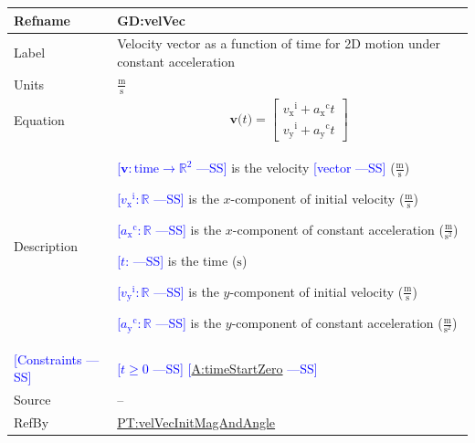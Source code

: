 \documentclass[12pt]{article}
\newcommand{\authornote}[3]{\textcolor{#1}{[#3 ---#2]}}
\newcommand{\authornote}[3]{}
\newcommand{\wss}[1]{\authornote{blue}{SS}{#1}}
\begin{document}
\noindent
\begin{minipage}{\textwidth}
\begin{tabular}{>{\raggedright}p{}>{\raggedright\arraybackslash}p{}}
\toprule \textbf{Refname} & \textbf{GD:velVec}
\label{GD:velVec}
\\ \midrule
Label & Velocity vector as a function of time for 2D motion under constant acceleration
        
\\ \midrule
Units & $\frac{\text{m}}{\text{s}}$
        
\\ \midrule
Equation & \begin{displaymath}
           \symbf{v}\text{(}t\text{)}=\begin{bmatrix}
                                      {{v_{\text{x}}}^{\text{i}}}+{{a_{\text{x}}}^{\text{c}}} t\\
                                      {{v_{\text{y}}}^{\text{i}}}+{{a_{\text{y}}}^{\text{c}}} t
                                      \end{bmatrix}
           \end{displaymath}
\\ \midrule
Description & \begin{symbDescription}
              \item{\wss{$\symbf{v}: \text{time} \rightarrow \mathbb{R}^2$} is the velocity \wss{vector} ($\frac{\text{m}}{\text{s}}$)}
              \item{\wss{${{v_{\text{x}}}^{\text{i}}}: \mathbb{R}$} is the $x$-component of initial velocity ($\frac{\text{m}}{\text{s}}$)}
              \item{\wss{${{a_{\text{x}}}^{\text{c}}}: \mathbb{R}$} is the $x$-component of constant acceleration ($\frac{\text{m}}{\text{s}^{2}}$)}
              \item{\wss{$t$: \text{time}} is the time (${\text{s}}$)}
              \item{\wss{${{v_{\text{y}}}^{\text{i}}}: \mathbb{R}$} is the $y$-component of initial velocity ($\frac{\text{m}}{\text{s}}$)}
              \item{\wss{${{a_{\text{y}}}^{\text{c}}}: \mathbb{R}$} is the $y$-component of constant acceleration ($\frac{\text{m}}{\text{s}^{2}}$)}
              \end{symbDescription}
\\ \midrule

\wss{Constraints} & \wss{$t \geq 0$} \wss{\hyperref[timeStartZero]{A:timeStartZero}}
\\ \midrule

Source & --
         
\\ \midrule
RefBy & \hyperref[PT:velVecInitMagAndAngle]{PT:velVecInitMagAndAngle}
\\ \bottomrule
\end{tabular}
\end{minipage}
\end{document}
